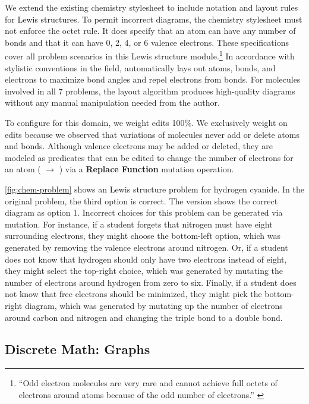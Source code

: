 We extend the existing \Penrose chemistry stylesheet to include notation and layout rules for Lewis structures. To permit incorrect diagrams, the chemistry stylesheet must not enforce the octet rule. It does specify that an atom can have any number of bonds and that it can have 0, 2, 4, or 6 valence electrons. These specifications cover all problem scenarios in this Lewis structure module.\footnote{``Odd electron molecules are very rare and cannot achieve full octets of electrons around atoms because of the odd number of electrons.'' \cite{oli}} In accordance with stylistic conventions in the field, \Edgeworth automatically lays out atoms, bonds, and electrons to maximize bond angles and repel electrons from bonds. 
 For molecules involved in all 7 problems, the layout algorithm produces high-quality diagrams without any manual manipulation needed from the author. 

To configure \Edgeworth for this domain, we weight edits 100\%. We exclusively weight on edits because we observed that variations of molecules never add or delete atoms and bonds. Although valence electrons may be added or deleted, they are modeled as predicates that can be edited to change the number of electrons for an atom (\eg {} $\rightarrow$ ) via a \textbf{Replace Function} mutation operation. 

\cref{fig:chem-problem} shows an \Edgeworth Lewis structure problem for hydrogen cyanide. In the original problem, the third option is correct. The \Edgeworth version shows the correct diagram as option 1. Incorrect choices for this problem can be generated via mutation. For instance, if a student forgets that nitrogen must have eight surrounding electrons, they might choose the bottom-left option, which was generated by removing the valence electrons around nitrogen. Or, if a student does not know that hydrogen should only have two electrons instead of eight, they might select the top-right choice, which was generated by mutating the number of electrons around hydrogen from zero to six. Finally, if a student does not know that free electrons should be minimized, they might pick the bottom-right diagram, which was generated by mutating up the number of electrons around carbon and nitrogen and changing the triple bond to a double bond.

\subsection{Discrete Math: Graphs}
\label{sec:graphs}

